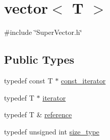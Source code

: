 \hypertarget{classvector}{}\section{vector$<$ T $>$}
\label{classvector}


{\ttfamily \#include \char`\"{}Super\+Vector.\+h\char`\"{}}

\subsection*{Public Types}
\begin{DoxyCompactItemize}
\item 
typedef const T $\ast$ \mbox{\hyperlink{classvector_a2fc97dce62b7053449cc868607540dba}{const\+\_\+iterator}}
\item 
typedef T $\ast$ \mbox{\hyperlink{classvector_a35c955cacac6aacaa1e82874b1628865}{iterator}}
\item 
typedef T \& \mbox{\hyperlink{classvector_a9b1a63f171d76a7a3995b6858e99f2ea}{reference}}
\item 
typedef unsigned int \mbox{\hyperlink{classvector_ada51e68d31936547d3729c82daf6b7c6}{size\+\_\+type}}
\end{DoxyCompactItemize}
